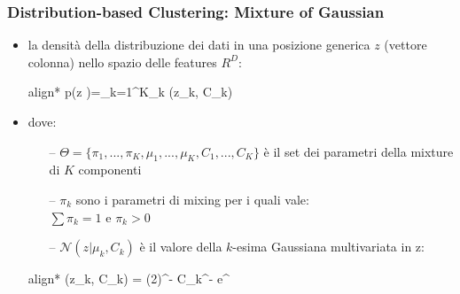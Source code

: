 \begin{frame}

	\frametitle{{\color{GradientDescentDiagramOrange}Distribution-based Clustering}: Mixture of Gaussian}

		\begin{itemize}
			\item la densità della distribuzione dei dati in una posizione generica $z$ (vettore colonna) nello spazio delle features $R^D$:
				\begin{empheq}[box=\fcolorbox{blue!40!black!60}{yellow!10}]{align*}
					p(z \vert \Theta )=\sum_{k=1}^{K}\pi_k (z\vert\mu_k, C_k)
				\end{empheq}
			\item dove:
				\begin{itemize}
					\item[--] $\Theta = \{ \pi_1, ..., \pi_K, \mu_1, ..., \mu_K, C_1, ..., C_K\}$ è il set dei parametri della mixture di $K$ componenti
					\item[--] $\pi_k$ sono i parametri di mixing per i quali vale:\\
						$\sum\pi_k=1$ e $\pi_k>0$
					\item[--] $\mathcal{N}(z\vert\mu_k, C_k)$ è il valore della $k$-esima Gaussiana multivariata in z:
				\end{itemize}
				
				\begin{empheq}[box=\fcolorbox{blue!40!black!60}{yellow!10}]{align*}
					(z\vert\mu_k, C_k) = (2\pi)^{-} {\vert C_k\vert}^{-} e^{\frac{-(z-\mu_k)^T C_{k}^{-1} (z-\mu_k)}{2}}
				\end{empheq}

		\end{itemize}

\end{frame}


